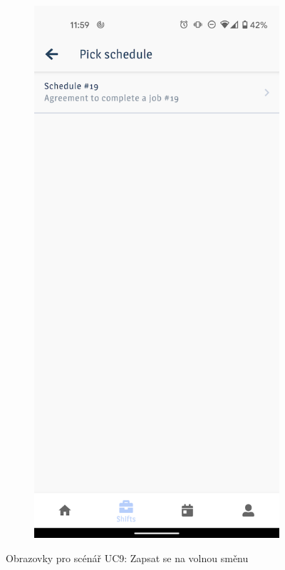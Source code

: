 \documentclass[twoside]{ctuthesis}
\begin{document}
\begin{figure}[ht]
	\begin{subfigure}[h!]{.5\textwidth}
		\centering
		\includegraphics[width=.9\linewidth]{img/uc9b.png}
		\label{uc9b}
	\end{subfigure}
	\caption{Obrazovky pro scénář UC9: Zapsat se na volnou směnu}
\end{figure}
\end{document}
